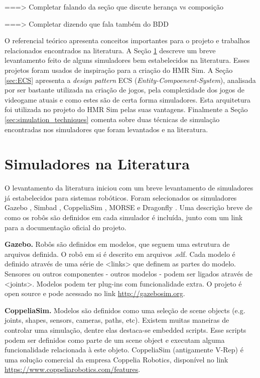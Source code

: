 \label{chapter:referencial}

===> Completar falando da seção que discute herança vs composição

===> Completar dizendo que fala também do BDD


O referencial teórico apresenta conceitos importantes para o projeto e trabalhos relacionados encontrados na literatura. A Seção \ref{sec:outros_simuladores} descreve um breve levantamento feito de alguns simuladores bem estabelecidos na literatura. Esses projetos foram usados de inspiração para a criação do HMR Sim. A Seção \ref{sec:ECS} apresenta a \textit{design pattern} ECS (\textit{Entity-Compoenent-System}), analisada por ser bastante utilizada na criação de jogos, pela complexidade dos jogos de videogame atuais e como estes são de certa forma simuladores. Esta arquitetura foi utilizada no projeto do HMR Sim pelas suas vantagens. Finalmente a Seção \ref{sec:simulation_techniques} comenta sobre duas técnicas de simulação encontradas nos simuladores que foram levantados e na literatura.

\section{Simuladores na Literatura}
\label{sec:outros_simuladores}

O levantamento da literatura iniciou com um breve levantamento de simuladores já estabelecidos para sistemas robóticos. Foram selecionados os simuladores Gazebo \cite{koenig2004gazebo}, Simbad \cite{hugues2006simbad}, CoppeliaSim \cite{rohmer2013coopeliasim}, MORSE \cite{echeverria2011morse} e Dragonfly \cite{maia2019dragonfly}. Uma descrição breve de como os robôs são definidos em cada simulador é incluída, junto com um link para a documentação oficial do projeto.

\textbf{Gazebo.} Robôs são definidos em modelos, que seguem uma estrutura de arquivos definida. O robô em si é descrito em arquivos .sdf. Cada modelo é definido através de uma série de <links> que definem as partes do modelo. Sensores ou outros componentes - outros modelos - podem ser ligados através de <joints>. Modelos podem ter plug-ins com funcionalidade extra. O projeto é open source e pode acessado no link \url{http://gazebosim.org}. 

\textbf{CoppeliaSim.} Modelos são definidos como uma seleção de scene objects (e.g. joints, shapes, sensors, cameras, paths, etc). Existem muitas maneiras de controlar uma simulação, dentre elas destaca-se embedded scripts. Esse scripts podem ser definidos como parte de um scene object e executam alguma funcionalidade relacionada à este objeto. CoppeliaSim (antigamente V-Rep) é uma solução comercial da empresa Coppelia Robotics, disponível no link \url{https://www.coppeliarobotics.com/features}.

